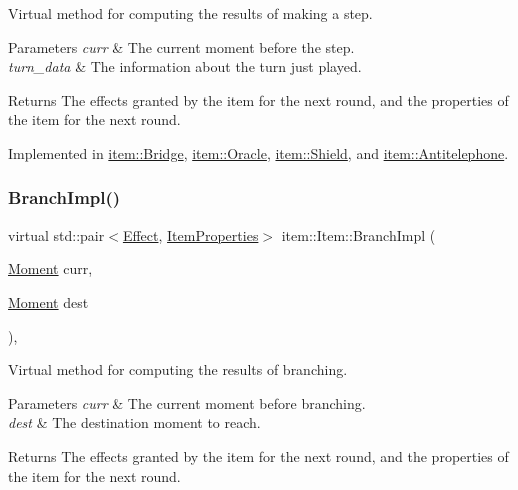 Virtual method for computing the results of making a step. 


\begin{DoxyParams}{Parameters}
{\em curr} & The current moment before the step. \\
\hline
{\em turn\+\_\+data} & The information about the turn just played. \\
\hline
\end{DoxyParams}
\begin{DoxyReturn}{Returns}
The effects granted by the item for the next round, and the properties of the item for the next round. 
\end{DoxyReturn}


Implemented in \hyperlink{classitem_1_1_bridge_a08aa3fdb36e203e489bc0af65dde451c}{item\+::\+Bridge}, \hyperlink{classitem_1_1_oracle_af765dd1df5a43de79539f9ce960854c0}{item\+::\+Oracle}, \hyperlink{classitem_1_1_shield_a0c446c3f436c4eb221ebafd817df9a5f}{item\+::\+Shield}, and \hyperlink{classitem_1_1_antitelephone_aa59b4569bac948f37fd15dbea234503f}{item\+::\+Antitelephone}.

\mbox{\label{classitem_1_1_item_afef6bdd5c1c734c67122e4118e9e1930}} 
\subsubsection{\texorpdfstring{Branch\+Impl()}{BranchImpl()}}
{\footnotesize\ttfamily virtual std\+::pair$<$\hyperlink{classitem_1_1_effect}{Effect}, \hyperlink{classitem_1_1_item_properties}{Item\+Properties}$>$ item\+::\+Item\+::\+Branch\+Impl (\begin{DoxyParamCaption}\item[{\hyperlink{classtimeplane_1_1_moment}{Moment}}]{curr,  }\item[{\hyperlink{classtimeplane_1_1_moment}{Moment}}]{dest }\end{DoxyParamCaption})\hspace{0.3cm}{\ttfamily [protected]}, {}}



Virtual method for computing the results of branching. 


\begin{DoxyParams}{Parameters}
{\em curr} & The current moment before branching. \\
\hline
{\em dest} & The destination moment to reach. \\
\hline
\end{DoxyParams}
\begin{DoxyReturn}{Returns}
The effects granted by the item for the next round, and the properties of the item for the next round. 
\end{DoxyReturn}


